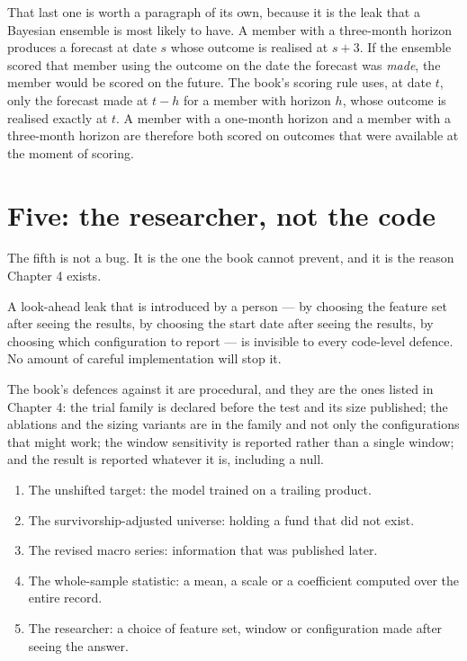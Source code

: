 That last one is worth a paragraph of its own, because it is the leak that
a Bayesian ensemble is most likely to have. A member with a three-month
horizon produces a forecast at date \(s\) whose outcome is realised at
\(s+3\). If the ensemble scored that member using the outcome on the date
the forecast was \emph{made}, the member would be scored on the future.
The book's scoring rule uses, at date \(t\), only the forecast made at
\(t - h\) for a member with horizon \(h\), whose outcome is realised
exactly at \(t\). A member with a one-month horizon and a member with a
three-month horizon are therefore both scored on outcomes that were
available at the moment of scoring.

\section{Five: the researcher, not the code}

The fifth is not a bug. It is the one the book cannot prevent, and it is
the reason Chapter 4 exists.

A look-ahead leak that is introduced by a person --- by choosing the
feature set after seeing the results, by choosing the start date after
seeing the results, by choosing which configuration to report --- is
invisible to every code-level defence. No amount of careful implementation
will stop it.

The book's defences against it are procedural, and they are the ones
listed in Chapter 4: the trial family is declared before the test and its
size published; the ablations and the sizing variants are in the family
and not only the configurations that might work; the window sensitivity is
reported rather than a single window; and the result is reported whatever
it is, including a null.

\begin{takeaway}
\begin{enumerate}
\item The unshifted target: the model trained on a trailing product.
\item The survivorship-adjusted universe: holding a fund that did not
exist.
\item The revised macro series: information that was published later.
\item The whole-sample statistic: a mean, a scale or a coefficient
computed over the entire record.
\item The researcher: a choice of feature set, window or configuration
made after seeing the answer.
\end{enumerate}
\end{takeaway}

